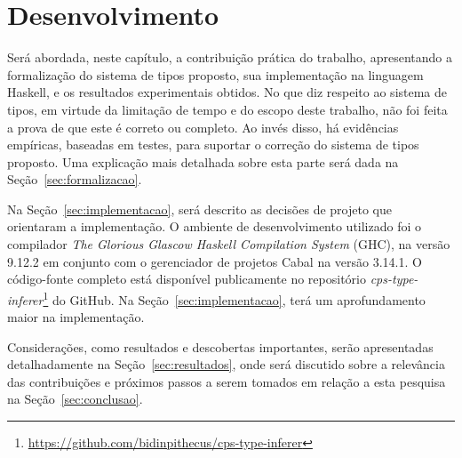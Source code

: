 \chapter{Desenvolvimento}\label{ch:desenvolvimento}

Será abordada, neste capítulo, a contribuição prática do trabalho, apresentando a formalização do sistema de tipos proposto, sua implementação na linguagem Haskell, e os resultados experimentais obtidos.
No que diz respeito ao sistema de tipos, em virtude da limitação de tempo e do escopo deste trabalho, não foi feita a prova de que este é correto ou completo.
Ao invés disso, há evidências empíricas, baseadas em testes, para suportar o correção do sistema de tipos proposto.
Uma explicação mais detalhada sobre esta parte será dada na Seção~\ref{sec:formalizacao}.

Na Seção~\ref{sec:implementacao}, será descrito as decisões de projeto que orientaram a implementação. 
O ambiente de desenvolvimento utilizado foi o compilador \textit{The Glorious Glascow Haskell Compilation System} (GHC), na versão 9.12.2 em conjunto com o gerenciador de projetos Cabal na versão 3.14.1.
O código-fonte completo está disponível publicamente no repositório \textit{cps-type-inferer}\footnote{\url{https://github.com/bidinpithecus/cps-type-inferer}} do GitHub.
Na Seção~\ref{sec:implementacao}, terá um aprofundamento maior na implementação.

Considerações, como resultados e descobertas importantes, serão apresentadas detalhadamente na Seção~\ref{sec:resultados}, onde será discutido sobre a relevância das contribuições e próximos passos a serem tomados em relação a esta pesquisa na Seção~\ref{sec:conclusao}.





